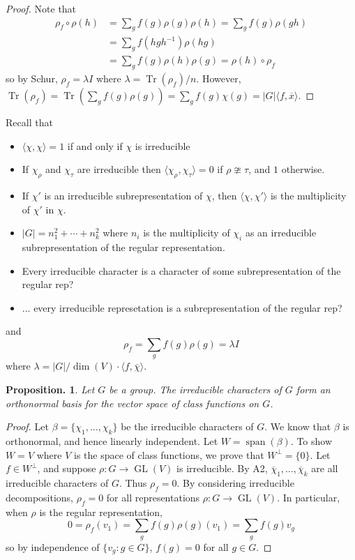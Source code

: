 \documentclass[11pt, a4paper]{memoir}
\theoremstyle{change}
\newtheorem{proposition}[theorem]{Proposition.}
\theoremstyle{plain}
\theoremstyle{nonumberplain}
\newtheorem{proof}{Proof}
\DeclareMathOperator{\GL}{GL}
\DeclareMathOperator{\spn}{span}
\DeclareMathOperator{\Tr}{Tr}
\numberwithin{equation}{section}
\begin{document}
\begin{proof}
    Note that
    \begin{align*}
        \rho_f\circ\rho(h)&=\sum_g f(g)\rho(g)\rho(h)=\sum_g f(g)\rho(gh)\\
                          &= \sum_g f(hgh^{-1})\rho(hg)\\
                          &= \sum_g f(g)\rho(h)\rho(g)=\rho(h)\circ\rho_f
    \end{align*}
    so by Schur, $\rho_f=\lambda I$ where $\lambda=\Tr(\rho_f)/n$.
    However, $\Tr(\rho_f)=\Tr(\sum_gf(g)\rho(g))=\sum_g f(g)\chi(g)=|G|\langle f,\overline{x}\rangle$.
\end{proof}
Recall that
\begin{itemize}[nl]
    \item $\langle\chi,\chi\rangle=1$ if and only if $\chi$ is irreducible
    \item If $\chi_\rho$ and $\chi_\tau$ are irreducible then $\langle\chi_\rho,\chi_\tau\rangle=0$ if $\rho\ncong\tau$, and $1$ otherwise.
    \item If $\chi'$ is an irreducible subrepresentation of $\chi$, then $\langle\chi,\chi'\rangle$ is the multiplicity of $\chi'$ in $\chi$.
    \item $|G|=n_1^2+\cdots+n_k^2$ where $n_i$ is the multiplicity of $\chi_i$ as an irreducible subrepresentation of the regular representation.
    \item Every irreducible character is a character of some subrepresentation of the regular rep?
    \item ... every irreducible represetation is a subrepresentation of the regular rep?
\end{itemize}
and
\begin{equation*}
    \rho_f=\sum_g f(g)\rho(g)=\lambda I
\end{equation*}
where $\lambda=|G|/\dim(V)\cdot\langle f,\overline{\chi}\rangle$.
\begin{proposition}
    Let $G$ be a group.
    The irreducible characters of $G$ form an orthonormal basis for the vector space of class functions on $G$.
\end{proposition}
\begin{proof}
    Let $\beta=\{\chi_1,\ldots,\chi_k\}$ be the irreducible characters of $G$.
    We know that $\beta$ is orthonormal, and hence linearly independent.
    Let $W=\spn(\beta)$.
    To show $W=V$ where $V$ is the space of class functions, we prove that $W^{\perp}=\{0\}$.
    Let $f\in W^\perp$, and suppose $\rho:G\to\GL(V)$ is irreducible.
    By A2, $\overline{\chi}_1,\ldots,\overline{\chi}_k$ are all irreducible characters of $G$.
    Thus $\rho_f=0$.
    By considering irreducible decompositions, $\rho_f=0$ for all representations $\rho:G\to\GL(V)$.
    In particular, when $\rho$ is the regular representation,
    \begin{equation*}
        0=\rho_f(v_1)=\sum_gf(g)\rho(g)(v_1)=\sum_g f(g)v_g
    \end{equation*}
    so by independence of $\{v_g:g\in G\}$, $f(g)=0$ for all $g\in G$.
\end{proof}
\end{document}
